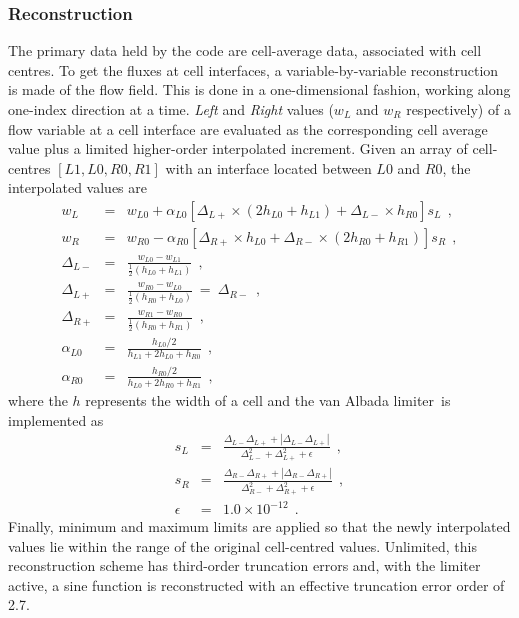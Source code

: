 \subsubsection{Reconstruction}
%
The primary data held by the code are cell-average data, associated with cell centres.
To get the fluxes at cell interfaces, a variable-by-variable reconstruction is made of the flow field.
This is done in a one-dimensional fashion, working along one-index direction at a time.
\textit{Left} and \textit{Right} values ($w_L$ and $w_R$ respectively) of a flow variable at a cell interface
are evaluated as the corresponding cell average value plus a limited higher-order interpolated increment.
Given an array of cell-centres $[L1,L0,R0,R1]$ with an interface located between $L0$ and $R0$, the interpolated
values are
\begin{eqnarray}
  w_L & = & w_{L0} + \alpha_{L0} \left[ \Delta_{L+} \times \left( 2 h_{L0} + h_{L1} \right) + \Delta_{L-} \times h_{R0} \right] s_L ~~, \nonumber \\
  w_R & = & w_{R0} - \alpha_{R0} \left[ \Delta_{R+} \times h_{L0} + \Delta_{R-} \times \left( 2 h_{R0} + h_{R1} \right) \right] s_R ~~, \nonumber \\
  \Delta_{L-} & = & \frac{w_{L0} - w_{L1}}{\frac{1}{2} \left( h_{L0} + h_{L1}\right)} ~~, \nonumber \\
  \Delta_{L+} & = & \frac{w_{R0} - w_{L0}}{\frac{1}{2} \left( h_{R0} + h_{L0} \right)} ~ = ~ \Delta_{R-} ~~, \nonumber \\
  \Delta_{R+} & = & \frac{w_{R1} - w_{R0}}{\frac{1}{2} \left( h_{R0} + h_{R1} \right)} ~~, \nonumber \\
  \alpha_{L0}  & = & \frac{h_{L0} / 2}{h_{L1} + 2 h_{L0} + h_{R0}} ~~, \nonumber \\
  \alpha_{R0}  & = & \frac{h_{R0} / 2}{h_{L0} + 2 h_{R0} + h_{R1}} ~~,
\end{eqnarray}
where the $h$ represents the width of a cell and the van Albada limiter\,\cite{vanalbada_etal_81} is implemented as
\begin{eqnarray}
 s_L & = & \frac{\Delta_{L-} \Delta_{L+} + |\Delta_{L-} \Delta_{L+}|}{\Delta_{L-}^2 + \Delta_{L+}^2 + \epsilon} ~~, \nonumber \\
 s_R & = & \frac{\Delta_{R-} \Delta_{R+} + |\Delta_{R-} \Delta_{R+}|}{\Delta_{R-}^2 + \Delta_{R+}^2 + \epsilon} ~~, \nonumber \\
 \epsilon & = & 1.0 \times 10^{-12} ~~. \nonumber
\end{eqnarray}
Finally, minimum and maximum limits are applied so that the newly interpolated values 
lie within the range of the original cell-centred values. 
Unlimited, this reconstruction scheme has third-order truncation errors and, with the limiter active, a sine function
is reconstructed with an effective truncation error order of 2.7.
 
